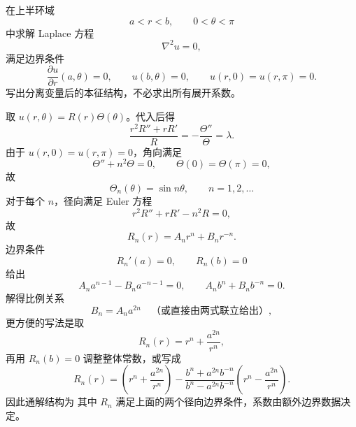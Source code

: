 \begin{question}
在上半环域
\[
 a<r<b,\qquad 0<\theta<\pi
\]
中求解 Laplace 方程
\[
\nabla^2u=0,
\]
满足边界条件
\[
\frac{\partial u}{\partial r}(a,\theta)=0,
\qquad u(b,\theta)=0,
\qquad u(r,0)=u(r,\pi)=0.
\]
写出分离变量后的本征结构，不必求出所有展开系数。
\begin{solution}

取 $u(r,\theta)=R(r)\Theta(\theta)$。代入后得
\[
\frac{r^2R''+rR'}{R}=-\frac{\Theta''}{\Theta}=\lambda.
\]
由于 $u(r,0)=u(r,\pi)=0$，角向满足
\[
\Theta''+n^2\Theta=0,
\qquad \Theta(0)=\Theta(\pi)=0,
\]
故
\[
\Theta_n(\theta)=\sin n\theta,
\qquad n=1,2,\dots
\]
对于每个 $n$，径向满足 Euler 方程
\[
r^2R''+rR'-n^2R=0,
\]
故
\[
R_n(r)=A_n r^n+B_n r^{-n}.
\]
边界条件
\[
R_n'(a)=0,
\qquad R_n(b)=0
\]
给出
\[
A_n a^{n-1}-B_n a^{-n-1}=0,
\qquad A_n b^n+B_n b^{-n}=0.
\]
解得比例关系
\[
B_n=A_n a^{2n}
\quad\text{（或直接由两式联立给出）},
\]
更方便的写法是取
\[
R_n(r)=r^n+\frac{a^{2n}}{r^n},
\]
再用 $R_n(b)=0$ 调整整体常数，或写成
\[
R_n(r)=\left(r^n+\frac{a^{2n}}{r^n}\right)-\frac{b^n+a^{2n}b^{-n}}{b^n-a^{2n}b^{-n}}\left(r^n-\frac{a^{2n}}{r^n}\right).
\]
因此通解结构为
其中 $R_n$ 满足上面的两个径向边界条件，系数由额外边界数据决定。
\end{solution}
\end{question}


